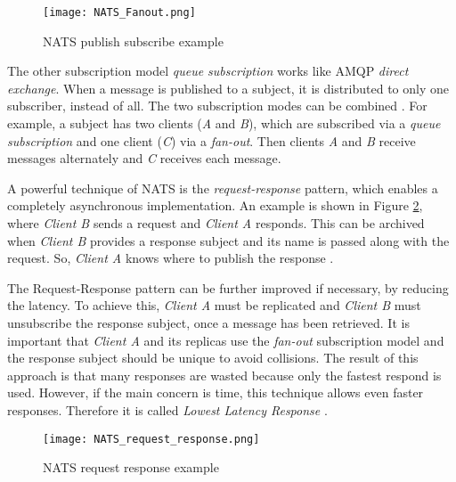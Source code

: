 \begin{figure}
	\centering
	\texttt{[image: NATS\_Fanout.png]}
	\caption{NATS publish subscribe example}
	\label{img:natspubsub}
\end{figure}

The other subscription model \textit{queue subscription} works like \ac{AMQP} \textit{direct exchange}.
When a message is published to a subject, it is distributed to only one subscriber, instead of all.
The two subscription modes can be combined \cite[p.~34ff.]{Quevedo.2018}.
For example, a subject has two clients (\textit{A} and \textit{B}), which are subscribed via a \textit{queue subscription} and one client (\textit{C}) via a \textit{fan-out}.
Then clients \textit{A} and \textit{B} receive messages alternately and \textit{C} receives each message.

A powerful technique of \ac{NATS} is the \textit{request-response} pattern, which enables a completely asynchronous implementation.
An example is shown in Figure \ref{img:natsreqres}, where \textit{Client B} sends a request and \textit{Client A} responds.
This can be archived when \textit{Client B} provides a response subject and its name is passed along with the request.
So, \textit{Client A} knows where to publish the response \cite[p.~38ff.]{Quevedo.2018}.

The Request-Response pattern can be further improved if necessary, by reducing the latency.
To achieve this, \textit{Client A} must be replicated and \textit{Client B} must unsubscribe the response subject, once a message has been retrieved.
It is important that \textit{Client A} and its replicas use the \textit{fan-out} subscription model and the response subject should be unique to avoid collisions.
The result of this approach is that many responses are wasted because only the fastest respond is used.
However, if the main concern is time, this technique allows even faster responses.
Therefore it is called \textit{Lowest Latency Response} \cite[p.~40f.]{Quevedo.2018}.

\begin{figure}
	\centering
	\texttt{[image: NATS\_request\_response.png]}
	\caption{NATS request response example}
	\label{img:natsreqres}
\end{figure}

